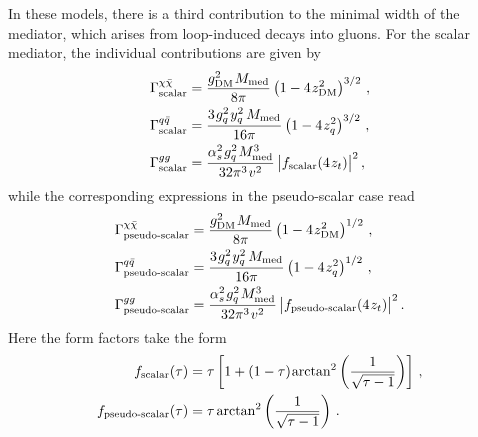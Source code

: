 In these models, there is a third contribution to the minimal width of the mediator, which arises from loop-induced decays into gluons. For the scalar mediator, the individual contributions are given by
\begin{align}
 \Gamma^{\chi\bar{\chi}}_{\text{scalar}} & = \frac{g_{\rm{DM}}^2 \hspace{0.25mm} M_{\rm{med}}}{8\pi}\left(1 - 4  \hspace{0.25mm}  z_{\rm{DM}}^2\right)^{3/2}\,, \\
 \Gamma^{q\bar{q}}_{\text{scalar}} & =  \frac{3 \hspace{0.25mm}  g_q^2 \hspace{0.25mm}  y_q^2 \, M_{\rm{med}}}{16\pi}\left(1 - 4 \hspace{0.25mm}  z_q^2\right)^{3/2}\, , \\
 \Gamma^{gg}_{\text{scalar}} & = \frac{\alpha_s^2  \hspace{0.25mm}  g_q^2 \hspace{0.25mm}   M_{\rm{med}}^3}{32\pi^3 \hspace{0.25mm}  v^2} \, \big |f_{\rm scalar} (4 \hspace{0.25mm}  z_t)\big |^2 \,, 
\end{align}
while the corresponding expressions in the pseudo-scalar case read 
\begin{align}
 \Gamma^{\chi\bar{\chi}}_{\text{pseudo-scalar}} & =  \frac{g_{\rm{DM}}^2 \hspace{0.25mm} M_{\rm{med}}}{8\pi}\left(1 - 4  \hspace{0.25mm}  z_{\rm{DM}}^2\right)^{1/2}\,, \\
 \Gamma^{q\bar{q}}_{\text{pseudo-scalar}} & = \frac{3 \hspace{0.25mm}  g_q^2 \hspace{0.25mm}  y_q^2 \, M_{\rm{med}}}{16\pi}\left(1 - 4 \hspace{0.25mm}  z_q^2\right)^{1/2}  \,, \\
 \Gamma^{gg}_{\text{pseudo-scalar}} & =\frac{\alpha_s^2  \hspace{0.25mm}  g_q^2 \hspace{0.25mm}   M_{\rm{med}}^3}{32\pi^3 \hspace{0.25mm}  v^2} \, \big |f_{\text{pseudo-scalar}} (4 \hspace{0.25mm}  z_t)\big |^2 \,.
\end{align}
Here the form factors take the form 
\begin{align}
 f_{\text{scalar}} (\tau) & = \tau\left[1+(1-\tau)  \hspace{0.25mm} \text{arctan}^2 \left(\frac{1}{\sqrt{\tau-1}}\right) \right] \,, \\
 f_{\text{pseudo-scalar}} (\tau) & = \tau \hspace{0.5mm} \text{arctan}^2 \left(\frac{1}{\sqrt{\tau-1}}\right) \,. \label{eq:fPS}
\end{align}
